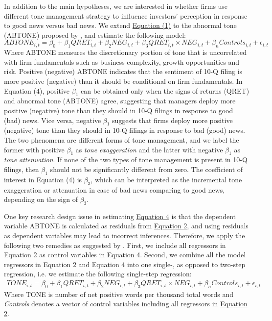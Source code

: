 \documentclass[a4paper]{article}
\begin{document}
\begin{spacing}{2}
In addition to the main hypotheses, we are interested in whether firms use different tone management strategy to influence investors' perception in response to good news versus bad news. We extend \hyperref[eq1]{Equation (1)} to the abnormal tone (ABTONE) proposed by \cite{huangToneManagement2014}, and estimate the following model:
\begin{equation} \label{eq4}
ABTONE_{i,t}=\beta_0+\beta_1QRET_{i,t}+\beta_2NEG_{i,t}+\beta_3QRET_{i,t}\times NEG_{i,t}+\beta_nControls_{i,t}+\epsilon_{i,t}
\end{equation}
Where ABTONE measures the discretionary portion of tone that is uncorrelated with firm fundamentals such as business complexity, growth opportunities and risk. Positive (negative) ABTONE indicates that the sentiment of 10-Q filing is more positive (negative) than it should be conditional on firm fundamentals. In Equation (4), positive $\beta_1$ can be obtained only when the signs of returns (QRET) and abnormal tone (ABTONE) agree, suggesting that managers deploy more positive (negative) tone than they should in 10-Q filings in response to good (bad) news. Vice versa, negative $\beta_1$ suggests that firms deploy more positive (negative) tone than they should in 10-Q filings in response to bad (good) news. The two phenomena are different forms of tone management, and we label the former with positive $\beta_1$ as \textit{tone exaggeration} and the latter with negative $\beta_1$ as \textit{tone attenuation}. If none of the two types of tone management is present in 10-Q filings, then $\beta_1$ should not be significantly different from zero. The coefficient of interest in Equation (4) is $\beta_3$, which can be interpreted as the incremental tone exaggeration or attenuation in case of bad news comparing to good news, depending on the sign of $\beta_3$.

One key research design issue in estimating \hyperref[eq4]{Equation 4} is that the dependent variable ABTONE is calculated as residuals from \hyperref[eq2]{Equation 2}, and using residuals as dependent variables may lead to incorrect inferences. Therefore, we apply the following two remedies as suggested by \cite{chenIncorrectInferencesWhen2018}. First, we include all regressors in Equation 2 as control variables in Equation 4. Second, we combine all the model regressors in Equation 2 and Equation 4 into one single-, as opposed to two-step regression, i.e. we estimate the following single-step regression:
\begin{equation} \label{eq5}
\begin{split}
TONE_{i,t}=\beta_0+\beta_1QRET_{i,t}+\beta_2NEG_{i,t}+\beta_3QRET_{i,t}\times NEG_{i,t}+\beta_nControls_{i,t}+\epsilon_{i,t}
\end{split}
\end{equation}
Where TONE is number of net positive words per thousand total words and \textit{Controls} denotes a vector of control variables including all regressors in \hyperref[eq2]{Equation 2}.


\end{spacing}
\end{document}
